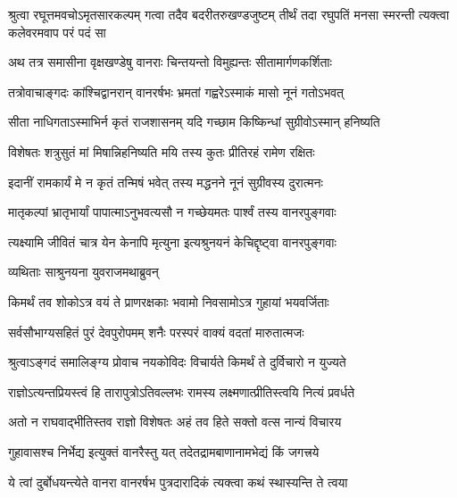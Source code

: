 \fourlineindentedshloka
{श्रुत्वा रघूत्तमवचोऽमृतसारकल्पम्}
{गत्वा तदैव बदरीतरुखण्डजुष्टम्}
{तीर्थं तदा रघुपतिं मनसा स्मरन्ती}
{त्यक्त्वा कलेवरमवाप परं पदं सा} %






\twolineshloka
{अथ तत्र समासीना वृक्षखण्डेषु वानराः}
{चिन्तयन्तो विमुह्यन्तः सीतामार्गणकर्शिताः} %

\twolineshloka
{तत्रोवाचाङ्गदः कांश्चिद्वानरान् वानरर्षभः}
{भ्रमतां गह्वरेऽस्माकं मासो नूनं गतोऽभवत्} %

\twolineshloka
{सीता नाधिगताऽस्माभिर्न कृतं राजशासनम्}
{यदि गच्छाम किष्किन्धां सुग्रीवोऽस्मान् हनिष्यति} %

\twolineshloka
{विशेषतः शत्रुसुतं मां मिषान्निहनिष्यति}
{मयि तस्य कुतः प्रीतिरहं रामेण रक्षितः} %

\twolineshloka
{इदानीं रामकार्यं मे न कृतं तन्मिषं भवेत्}
{तस्य मद्धनने नूनं सुग्रीवस्य दुरात्मनः} %

\twolineshloka
{मातृकल्पां भ्रातृभार्यां पापात्माऽनुभवत्यसौ}
{न गच्छेयमतः पार्श्वं तस्य वानरपुङ्गवाः} %

\twolineshloka
{त्यक्ष्यामि जीवितं चात्र येन केनापि मृत्युना}
{इत्यश्रुनयनं केचिद्दृष्ट्वा वानरपुङ्गवाः} %

\onelineshloka
{व्यथिताः साश्रुनयना युवराजमथाब्रुवन्} %

\twolineshloka
{किमर्थं तव शोकोऽत्र वयं ते प्राणरक्षकाः}
{भवामो निवसामोऽत्र गुहायां भयवर्जिताः} %

\twolineshloka
{सर्वसौभाग्यसहितं पुरं देवपुरोपमम्}
{शनैः परस्परं वाक्यं वदतां मारुतात्मजः} %

\twolineshloka
{श्रुत्वाऽङ्गदं समालिङ्ग्य प्रोवाच नयकोविदः}
{विचार्यते किमर्थं ते दुर्विचारो न युज्यते} %

\twolineshloka
{राज्ञोऽत्यन्तप्रियस्त्वं हि तारापुत्रोऽतिवल्लभः}
{रामस्य लक्ष्मणात्प्रीतिस्त्वयि नित्यं प्रवर्धते} %

\twolineshloka
{अतो न राघवाद्भीतिस्तव राज्ञो विशेषतः}
{अहं तव हिते सक्तो वत्स नान्यं विचारय} %

\twolineshloka
{गुहावासश्च निर्भेद्य इत्युक्तं वानरैस्तु यत्}
{तदेतद्रामबाणानामभेद्यं किं जगत्त्रये} %

\twolineshloka
{ये त्वां दुर्बोधयन्त्येते वानरा वानरर्षभ}
{पुत्रदारादिकं त्यक्त्वा कथं स्थास्यन्ति ते त्वया} %

